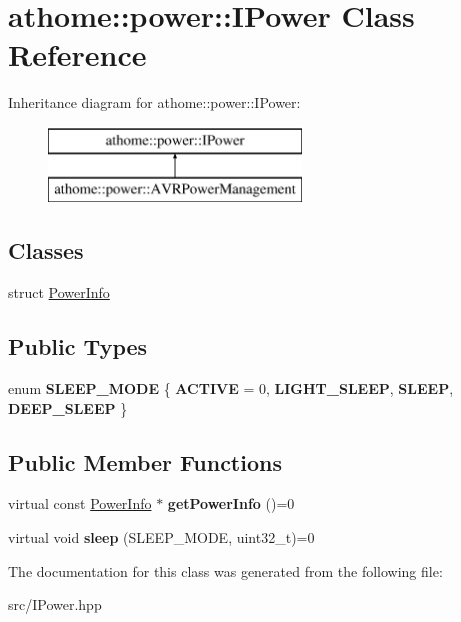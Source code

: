 \hypertarget{classathome_1_1power_1_1_i_power}{}\section{athome\+:\+:power\+:\+:I\+Power Class Reference}
\label{classathome_1_1power_1_1_i_power}
Inheritance diagram for athome\+:\+:power\+:\+:I\+Power\+:\begin{figure}[H]
\begin{center}
\leavevmode
\includegraphics[height=2.000000cm]{classathome_1_1power_1_1_i_power}
\end{center}
\end{figure}
\subsection*{Classes}
\begin{DoxyCompactItemize}
\item 
struct \mbox{\hyperlink{structathome_1_1power_1_1_i_power_1_1_power_info}{Power\+Info}}
\end{DoxyCompactItemize}
\subsection*{Public Types}
\begin{DoxyCompactItemize}
\item 
\mbox{\label{classathome_1_1power_1_1_i_power_a0d23b118e64d97d708f2c6d153310107}} 
enum {\bfseries S\+L\+E\+E\+P\+\_\+\+M\+O\+DE} \{ {\bfseries A\+C\+T\+I\+VE} = 0, 
{\bfseries L\+I\+G\+H\+T\+\_\+\+S\+L\+E\+EP}, 
{\bfseries S\+L\+E\+EP}, 
{\bfseries D\+E\+E\+P\+\_\+\+S\+L\+E\+EP}
 \}
\end{DoxyCompactItemize}
\subsection*{Public Member Functions}
\begin{DoxyCompactItemize}
\item 
\mbox{\label{classathome_1_1power_1_1_i_power_a2b5a55274b0ad8619d9283a80063a4df}} 
virtual const \mbox{\hyperlink{structathome_1_1power_1_1_i_power_1_1_power_info}{Power\+Info}} $\ast$ {\bfseries get\+Power\+Info} ()=0
\item 
\mbox{\label{classathome_1_1power_1_1_i_power_ab6ff871c84bf451acbf11fa524193e2c}} 
virtual void {\bfseries sleep} (S\+L\+E\+E\+P\+\_\+\+M\+O\+DE, uint32\+\_\+t)=0
\end{DoxyCompactItemize}


The documentation for this class was generated from the following file\+:\begin{DoxyCompactItemize}
\item 
src/I\+Power.\+hpp\end{DoxyCompactItemize}
